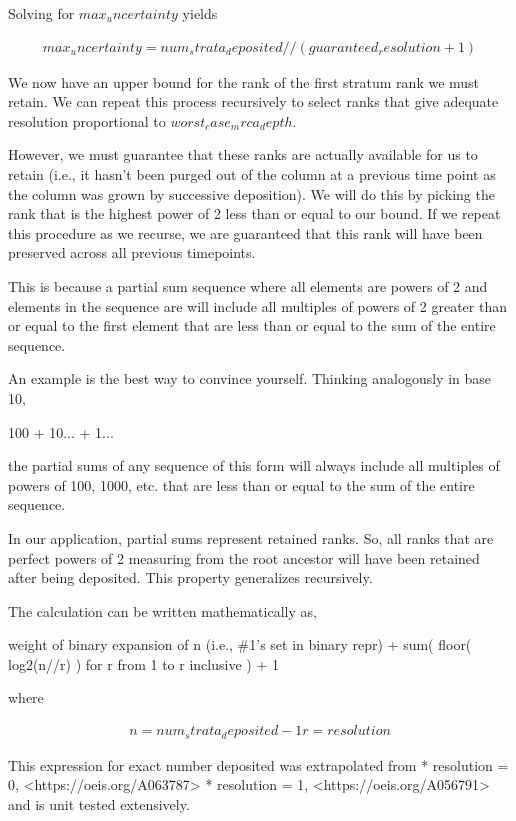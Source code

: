 Solving for $max_uncertainty$ yields

\begin{align*}
  max_uncertainty
  = num_strata_deposited // (guaranteed_resolution + 1)
\end{align*}

We now have an upper bound for the rank of the first stratum rank
we must retain. We can repeat this process recursively to select
ranks that give adequate resolution proportional to
$worst_case_mrca_depth$.

However, we must guarantee that these ranks are actually available for
us to retain (i.e., it hasn't been purged out of the column at a
previous time point as the column was grown by successive deposition).
We will do this by picking the rank that is the highest power of 2
less than or equal to our bound. If we repeat this procedure as we
recurse, we are guaranteed that this rank will have been preserved
across all previous timepoints.

This is because a partial sum sequence where all elements are powers
of 2 and elements in the sequence are will include all multiples of
powers of 2 greater than or equal to the first element that are less
than or equal to the sum of the entire
sequence.

An example is the best way to convince yourself. Thinking analogously
in base 10,

   100 + 10... + 1...

the partial sums of any sequence of this form will always include all
multiples of powers of 100, 1000, etc. that are less than or equal to
the sum of the entire sequence.

In our application, partial sums represent retained ranks. So, all
ranks that are perfect powers of 2 measuring from the root ancestor
will have been retained after being deposited. This property
generalizes recursively.

The calculation can be written mathematically as,

  weight of binary expansion of n (i.e., \#1's set in binary repr)
  + sum(
      floor( log2(n//r) )
      for r from 1 to r inclusive
  )
  + 1

where

\begin{align*}
  n = num_strata_deposited - 1
  r = resolution
\end{align*}

This expression for exact number deposited was extrapolated from
    * resolution = 0, <https://oeis.org/A063787> \citep{sloane2021a063787}
    * resolution = 1, <https://oeis.org/A056791> \citep{sloane2021a056791}
and is unit tested extensively.

